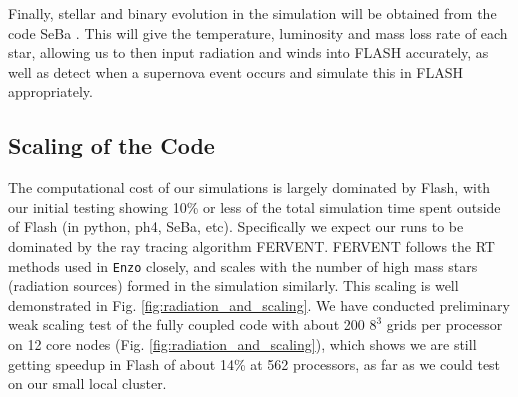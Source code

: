 \documentclass[11pt]{article}
\begin{document}
Finally, stellar and binary evolution in the simulation will be obtained from the code SeBa \citep{Portegies_SeBa}. This will give the temperature, luminosity and mass loss rate of each star, allowing us to then input radiation and winds into FLASH accurately, as well as detect when a supernova event occurs and simulate this in FLASH appropriately.

\subsection{Scaling of the Code}

The computational cost of our simulations is largely dominated by Flash, with our initial testing showing 10\% or less of the total simulation time spent outside of Flash (in python, ph4, SeBa, etc). Specifically we expect our runs to be dominated by the ray tracing algorithm FERVENT. FERVENT follows the RT methods used in \texttt{Enzo} closely, and scales with the number of high mass stars (radiation sources) formed in the simulation similarly. This scaling is well demonstrated in Fig. \ref{fig:radiation_and_scaling}. We have conducted preliminary weak scaling test of the fully coupled code with about 200 $8^3$ grids per processor on 12 core nodes (Fig. \ref{fig:radiation_and_scaling}), which shows we are still getting speedup in Flash of about 14\% at 562 processors, as far as we could test on our small local cluster.



\clearpage

\begingroup
    \setlength{\bibsep}{10pt}
    
\endgroup
\end{document}
